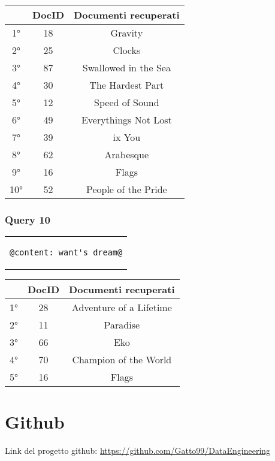 \documentclass{article}
\begin{document}
\begin{table}[h!]
\centering
    \begin{tabular}{|c|c|c|}
    \hline
    & DocID & Documenti recuperati\\
    \hline
    1° & 18 & Gravity\\
    \hline
    2° & 25 & Clocks\\
    \hline
    3° & 87 & Swallowed in the Sea\\
    \hline
    4° & 30 & The Hardest Part\\
    \hline
    5° & 12 & Speed of Sound\\
    \hline
    6° & 49 & Everythings Not Lost\\
    \hline
    7° & 39 & ix You\\
    \hline
    8° & 62 & Arabesque\\
    \hline
    9° & 16 & Flags\\
    \hline
    10° & 52 & People of the Pride\\
    \hline
\end{tabular}
\end{table}

\subsubsection{Query 10}
\begin{center}
\begin{tabular}{c}
\begin{lstlisting}[style=prompt]
    @content: want's dream@
\end{lstlisting}
\end{tabular}    
\end{center}

\begin{table}[h!]
\centering
    \begin{tabular}{|c|c|c|}
    \hline
    & DocID & Documenti recuperati\\
    \hline
    1° & 28 & Adventure of a Lifetime\\
    \hline
    2° & 11 & Paradise\\
    \hline
    3° & 66 & Eko\\
    \hline
    4° & 70 & Champion of the World\\
    \hline
    5° & 16 & Flags\\
    \hline
\end{tabular}
\end{table}
\section{Github}
Link del progetto github: \url{https://github.com/Gatto99/DataEngineering}
\end{document}
